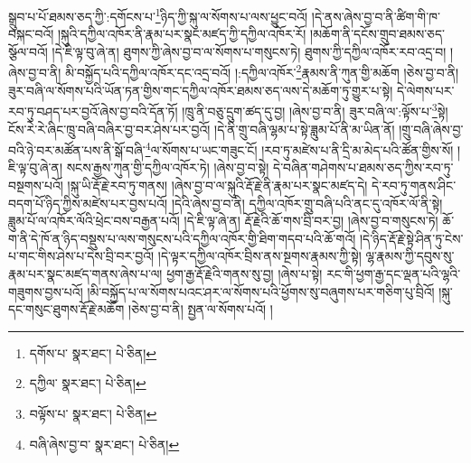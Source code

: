སྒྲུབ་པ་པོ་ཐམས་ཅད་ཀྱི་:དགོངས་པ་\footnote{དགོས་པ་  སྣར་ཐང་།  པེ་ཅིན། }ཉིད་ཀྱི་སྐུ་ལ་སོགས་པ་ལས་ཕྱུང་བའོ། །དེ་ནས་ཞེས་བྱ་བ་ནི་ཚིག་གི་ཁ་བསྐང་བའོ། །སྐུའི་དཀྱིལ་འཁོར་ནི་རྣམ་པར་སྣང་མཛད་ཀྱི་དཀྱིལ་འཁོར་རོ། །མཆོག་ནི་དངོས་གྲུབ་ཐམས་ཅད་སྩོལ་བའོ། །དེ་ཇི་ལྟ་བུ་ཞེ་ན། ཐུགས་ཀྱི་ཞེས་བྱ་བ་ལ་སོགས་པ་གསུངས་ཏེ། ཐུགས་ཀྱི་དཀྱིལ་འཁོར་རབ་འདྲ་བ། །ཞེས་བྱ་བ་ནི། མི་བསྐྱོད་པའི་དཀྱིལ་འཁོར་དང་འདྲ་བའོ། །:དཀྱིལ་འཁོར་\footnote{དཀྱིལ་  སྣར་ཐང་།  པེ་ཅིན། }རྣམས་ནི་ཀུན་གྱི་མཆོག །ཅེས་བྱ་བ་ནི། ཟུར་བཞི་ལ་སོགས་པའི་ཡོན་ཏན་གྱིས་གང་དཀྱིལ་འཁོར་ཐམས་ཅད་ལས་དེ་མཆོག་ཏུ་གྱུར་པ་སྟེ། དེ་ལེགས་པར་རབ་ཏུ་བཤད་པར་བྱའོ་ཞེས་བྱ་བའི་དོན་ཏོ། །ཁྲུ་ནི་བཅུ་དྲུག་ཚད་དུ་བྱ། །ཞེས་བྱ་བ་ནི། ཟུར་བཞི་ལ་:ལྟོས་པ་\footnote{བལྟོས་པ་  སྣར་ཐང་།  པེ་ཅིན། }སྟེ། ངོས་རེ་རེ་ཞིང་ཁྲུ་བཞི་བཞིར་བྱ་བར་ཤེས་པར་བྱའོ། །དེ་ནི་གྲུ་བཞི་ལྷམ་པ་སྟེ་ཟླུམ་པོ་ནི་མ་ཡིན་ནོ། །གྲུ་བཞི་ཞེས་བྱ་བའི་ཉེ་བར་མཚོན་པས་ནི་སྒོ་བཞི་\footnote{བཞི་ཞེས་བྱ་བ་  སྣར་ཐང་།  པེ་ཅིན། }ལ་སོགས་པ་ཡང་གཟུང་ངོ། །རབ་ཏུ་མཛེས་པ་ནི་དྲི་མ་མེད་པའི་ཚོན་གྱིས་སོ། །ཇི་ལྟ་བུ་ཞེ་ན། སངས་རྒྱས་ཀུན་གྱི་དཀྱིལ་འཁོར་ཏེ། །ཞེས་བྱ་བ་སྟེ། དེ་བཞིན་གཤེགས་པ་ཐམས་ཅད་ཀྱིས་རབ་ཏུ་བསྔགས་པའོ། །སྐུ་ཡི་རྡོ་རྗེ་རབ་ཏུ་གནས། །ཞེས་བྱ་བ་ལ་སྐུའི་རྡོ་རྗེ་ནི་རྣམ་པར་སྣང་མཛད་དེ། དེ་རབ་ཏུ་གནས་ཤིང་བདག་པོ་ཉིད་ཀྱིས་མཛེས་པར་བྱས་པའོ། །དེའི་ཞེས་བྱ་བ་ནི། དཀྱིལ་འཁོར་གྲུ་བཞི་པའི་ནང་དུ་འཁོར་ལོ་ནི་སྟེ། ཟླུམ་པོ་ལ་འཁོར་ལོའི་ཕྲེང་བས་བརྒྱན་པའོ། །དེ་ཇི་ལྟ་ཞེ་ན། རྡོ་རྗེའི་ཆོ་གས་བྲི་བར་བྱ། །ཞེས་བྱ་བ་གསུངས་ཏེ། ཆོ་ག་ནི་དེ་ཁོ་ན་ཉིད་བསྡུས་པ་ལས་གསུངས་པའི་དཀྱིལ་འཁོར་གྱི་ཐིག་གདབ་པའི་ཆོ་གའོ། །དེ་ཉིད་རྡོ་རྗེ་སྟེ་ཤིན་ཏུ་ངེས་པ་གང་གིས་ཤེས་པ་དེས་བྲི་བར་བྱའོ། །དེ་ལྟར་དཀྱིལ་འཁོར་བྲིས་ནས་སྔགས་རྣམས་ཀྱི་སྟེ། ལྷ་རྣམས་ཀྱི་དབུས་སུ་རྣམ་པར་སྣང་མཛད་གནས་ཞེས་པ་ལ། ཕྱག་རྒྱ་རྡོ་རྗེའི་གནས་སུ་བྱ། །ཞེས་པ་སྟེ། རང་གི་ཕྱག་རྒྱ་དང་ལྡན་པའི་ལྷའི་གཟུགས་བྱས་པའོ། །མི་བསྐྱོད་པ་ལ་སོགས་པའང་ཤར་ལ་སོགས་པའི་ཕྱོགས་སུ་བཞུགས་པར་གཅིག་པུ་བྲིའོ། །སྐུ་དང་གསུང་ཐུགས་རྡོ་རྗེ་མཆོག །ཅེས་བྱ་བ་ནི། སྤྱན་ལ་སོགས་པའོ། །
